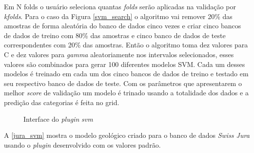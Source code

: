 Em N folds o usuário seleciona quantas \textit{folds} serão aplicadas na validação por \textit{kfolds}. Para o caso da Figura \autoref{svm_search} o algoritmo vai remover 20\% das amostras de forma aleatória do banco de dados cinco vezes e criar cinco bancos de dados de treino com 80\% das amostras e cinco banco de dados de teste correspondentes com 20\% das amostras. Então o algoritmo toma dez valores para C e dez valores para \textit{gamma} aleatoriamente nos intervalos selecionados, esses valores são combinados para gerar 100 diferentes modelos SVM. Cada um desses modelos é treinado em cada um dos cinco bancos de dados de treino e testado em seu respectivo banco de dados de teste. Com os parâmetros que apresentarem o melhor \textit{score} de validação um modelo é trinado usando a totalidade dos dados e a predição das categorias é feita no grid.

\begin{figure}[H] 
    \centering
    \caption{Interface do \textit{plugin} \textit{svm}} \label{svm_plug}
     \hspace{1em}
\end{figure}

A \autoref{jura_svm} mostra o modelo geológico criado para o banco de dados \textit{Swiss Jura} usando o \textit{plugin} desenvolvido com os valores padrão.

